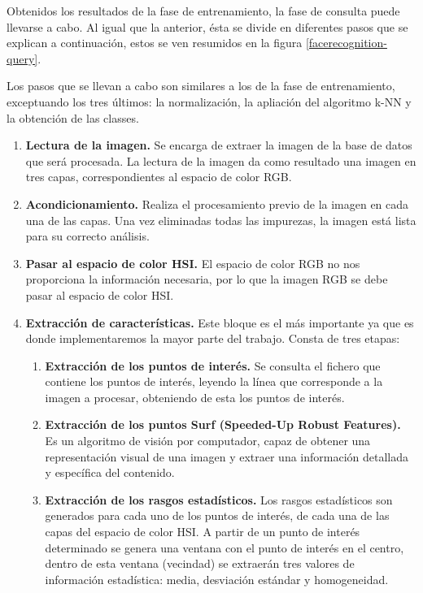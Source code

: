 Obtenidos los resultados de la fase de entrenamiento, la fase de consulta puede llevarse a cabo. Al igual que la anterior, \'esta se divide en diferentes pasos que se explican a continuación, estos se ven resumidos en la figura \ref{facerecognition-query}.


Los pasos que se llevan a cabo son similares a los de la fase de entrenamiento, exceptuando los tres \'ultimos: la normalización, la apliaci\'on del algoritmo k-NN y la obtenci\'on de las classes.

\begin{enumerate}
	\item \textbf{Lectura de la imagen.} Se encarga de extraer la imagen de la base de datos que ser\'a procesada. La lectura de la imagen da como resultado una imagen en tres capas, correspondientes al espacio de color RGB.
	\item \textbf{Acondicionamiento.} Realiza el procesamiento previo de la imagen en cada una de las capas. Una vez eliminadas todas las impurezas, la imagen est\'a lista para su correcto an\'alisis.
	\item \textbf{Pasar al espacio de color HSI.} El espacio de color RGB no nos proporciona la informaci\'on necesaria, por lo que la imagen RGB se debe pasar al espacio de color HSI.
	\item \textbf{Extracci\'on de caracter\'isticas.} Este bloque es el m\'as importante ya que es donde implementaremos la mayor parte del trabajo. Consta de tres etapas:
		\begin{enumerate}
		\item \textbf{Extracci\'on de los puntos de inter\'es.} Se consulta el fichero que contiene los puntos de inter\'es, leyendo la l\'inea que corresponde a la imagen a procesar, obteniendo de esta los puntos de inter\'es.
		\item \textbf{Extracci\'on de los puntos Surf (Speeded-Up Robust Features).} Es un algoritmo de visi\'on por computador, capaz de obtener una representaci\'on visual de una imagen y extraer una informaci\'on detallada y espec\'ifica del contenido. 
		\item \textbf{Extracci\'on de los rasgos estad\'isticos.} Los rasgos estad\'isticos son generados para cada uno de los puntos de inter\'es, de cada una de las capas del espacio de color HSI. A partir de un punto de inter\'es determinado se genera una ventana con el punto de inter\'es en el centro, dentro de esta ventana (vecindad) se extraer\'an tres valores de informaci\'on estad\'istica: media, desviaci\'on est\'andar y homogeneidad.

\end{enumerate}
\end{enumerate}
